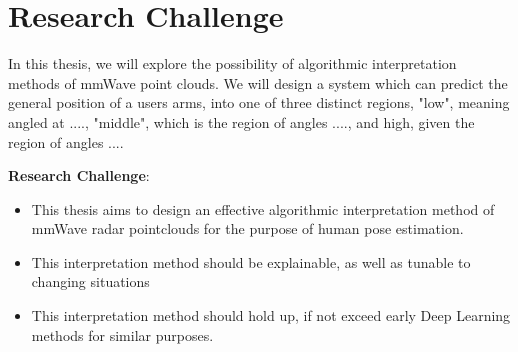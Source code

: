 \section{Research Challenge}
\label{section: introduction - research challenge}

In this thesis, we will explore the possibility of algorithmic interpretation methods of mmWave point clouds.
We will design a system which can predict the general position of a users arms, into one of three distinct regions, "low", meaning angled at ...., "middle", which is the region of angles ...., and high, given the region of angles ....

\textbf{Research Challenge}: 
\begin{itemize}
    \item 
    This thesis aims to design an effective algorithmic interpretation method of mmWave radar pointclouds for the purpose of human pose estimation.
    \item
    This interpretation method should be explainable, as well as tunable to changing situations
    \item
    This interpretation method should hold up, if not exceed early Deep Learning methods for similar purposes.
\end{itemize}